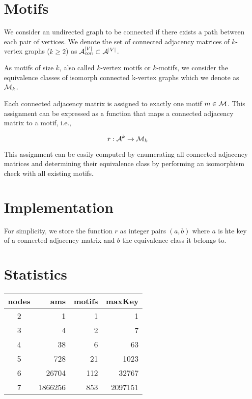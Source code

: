 \documentclass{article}
\newcommand{\eqn}[1]{
	\begin{equation*}
		#1
	\end{equation*}
}
\begin{document}





\section{Motifs}

We consider an undirected graph to be connected if there exists a path between each pair of vertices.
We denote the set of connected adjacency matrices of $k$-vertex graphs ($k \geq 2$) as ${\cal A}^{|V|}_{con} \subset {\cal A}^{|V|}$.

As motifs of size $k$, also called $k$-vertex motifs or $k$-motifs, we consider the equivalence classes of isomorph connected k-vertex graphs which we denote as ${\cal M}_k$.

Each connected adjacency matrix is assigned to exactly one motif $m \in {\cal M}$.
This assignment can be expressed as a function that maps a connected adjacency matrix to a motif, i.e.,

\eqn{r : {\cal A}^k \rightarrow {\cal M}_k}


This assignment can be easily computed by enumerating all connected adjacency matrices and determining their equivalence class by performing an isomorphism check with all existing motifs.




\section{Implementation}

For simplicity, we store the function $r$ as integer pairs $(a,b)$ where $a$ is hte key of a connected adjacency matrix and $b$ the equivalence class it belongs to.






\section{Statistics}

\begin{table}[!h]
\begin{tabular}{crrr}
\toprule
nodes	& ams	& motifs	& maxKey \\
\midrule
2	& 1	& 1	& 1 \\
3	& 4	& 2	& 7 \\
4	& 38	& 6	& 63 \\
5	& 728	& 21	& 1023 \\
6	& 26704	& 112	& 32767 \\
7	& 1866256	& 853	& 2097151 \\
\bottomrule
\end{tabular}
\end{table}
\end{document}
